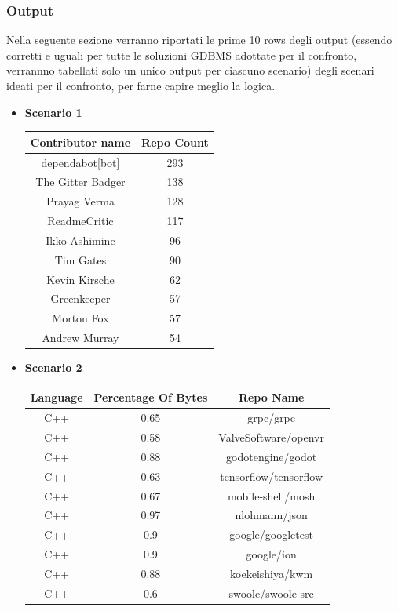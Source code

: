 \documentclass[11pt]{article}
\begin{document}
\subsubsection{Output}
Nella seguente sezione verranno riportati le prime 10 rows degli output (essendo corretti e uguali per tutte le soluzioni GDBMS adottate per il confronto, verrannno tabellati solo un unico output per ciascuno scenario) degli scenari ideati per il confronto, per farne capire meglio la logica. 
\begin{itemize}
    \item \textbf{Scenario 1}

    
\begin{table}[!ht]
    \centering
    \begin{tabular}{cc}
    \toprule
    Contributor name & Repo Count \\
    \midrule
    dependabot[bot] & 293 \\
    The Gitter Badger & 138 \\
    Prayag Verma & 128 \\
    ReadmeCritic & 117 \\
    Ikko Ashimine & 96 \\
    Tim Gates & 90 \\
    Kevin Kirsche & 62 \\
    Greenkeeper & 57 \\
    Morton Fox & 57 \\
    Andrew Murray & 54 \\
    \bottomrule
    \end{tabular}
\end{table}



    \item \textbf{Scenario 2}

\begin{table}[!ht]
    \centering
    \begin{tabular}{ccc}
    \toprule
    Language & Percentage Of Bytes & Repo Name\\
    \midrule
    C++ & 0.65 & grpc/grpc\\
    C++ & 0.58 & ValveSoftware/openvr\\
    C++ & 0.88 & godotengine/godot\\
    C++ & 0.63 & tensorflow/tensorflow\\
    C++ & 0.67 & mobile-shell/mosh\\
    C++ & 0.97 & nlohmann/json\\
    C++ & 0.9 & google/googletest\\
    C++ & 0.9 & google/ion\\
    C++ & 0.88 & koekeishiya/kwm\\
    C++ & 0.6 & swoole/swoole-src\\
    \bottomrule
    \end{tabular}
\end{table}



\end{itemize}
\end{document}
